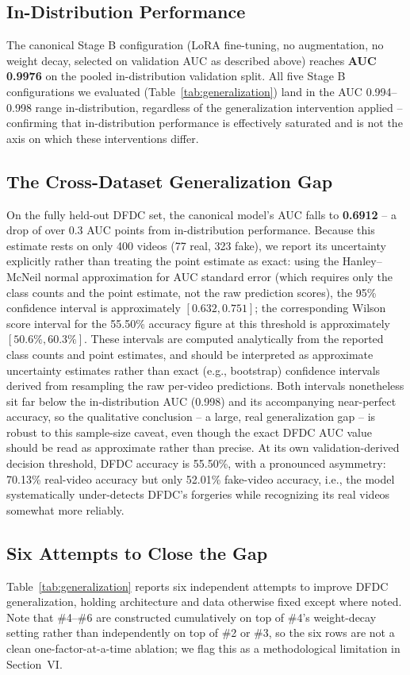\documentclass[conference]{IEEEtran}
\begin{document}
\subsection{In-Distribution Performance}
The canonical Stage B configuration (LoRA fine-tuning, no augmentation, no
weight decay, selected on validation AUC as described above) reaches
\textbf{AUC 0.9976} on the pooled in-distribution validation split. All five
Stage B configurations we evaluated (Table~\ref{tab:generalization}) land in
the AUC 0.994--0.998 range in-distribution, regardless of the
generalization intervention applied -- confirming that in-distribution
performance is effectively saturated and is not the axis on which these
interventions differ.

\subsection{The Cross-Dataset Generalization Gap}
On the fully held-out DFDC set, the canonical model's AUC falls to
\textbf{0.6912} -- a drop of over 0.3 AUC points from in-distribution
performance. Because this estimate rests on only 400 videos (77 real, 323
fake), we report its uncertainty explicitly rather than treating the point
estimate as exact: using the Hanley--McNeil normal approximation for AUC
standard error \cite{hanley1982auc} (which requires only the class counts
and the point estimate, not the raw prediction scores), the 95\% confidence
interval is approximately $[0.632, 0.751]$; the corresponding Wilson score
interval \cite{wilson1927} for the 55.50\% accuracy figure at this
threshold is approximately $[50.6\%, 60.3\%]$. These intervals are computed
analytically from the reported class counts
and point estimates, and should be interpreted as approximate uncertainty
estimates rather than exact (e.g., bootstrap) confidence intervals derived
from resampling the raw per-video predictions. Both intervals nonetheless
sit far below the in-distribution AUC (0.998) and its accompanying
near-perfect accuracy, so the qualitative conclusion -- a large, real
generalization gap -- is robust to this sample-size caveat, even though the
exact DFDC AUC value should be read as approximate rather than precise. At
its own validation-derived decision threshold, DFDC accuracy is 55.50\%,
with a pronounced asymmetry: 70.13\% real-video accuracy but only 52.01\%
fake-video accuracy, i.e., the model systematically under-detects DFDC's
forgeries while recognizing its real videos somewhat more reliably.

\subsection{Six Attempts to Close the Gap}
Table~\ref{tab:generalization} reports six independent attempts to improve
DFDC generalization, holding architecture and data otherwise fixed except
where noted. Note that \#4--\#6 are constructed cumulatively on top of \#4's
weight-decay setting rather than independently on top of \#2 or \#3, so the
six rows are not a clean one-factor-at-a-time ablation; we flag this as a
methodological limitation in Section~VI.
\end{document}

